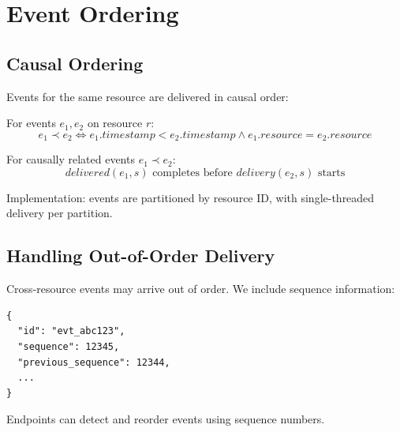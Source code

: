 \section{Event Ordering}


\subsection{Causal Ordering}

Events for the same resource are delivered in causal order:

\begin{definition}
For events $e_1, e_2$ on resource $r$:
\[
e_1 \prec e_2 \iff e_1.timestamp < e_2.timestamp \land e_1.resource = e_2.resource
\]
\end{definition}

\begin{theorem}
For causally related events $e_1 \prec e_2$:
\[
delivered(e_1, s) \text{ completes before } delivery(e_2, s) \text{ starts}
\]
\end{theorem}

Implementation: events are partitioned by resource ID, with single-threaded delivery per partition.

\subsection{Handling Out-of-Order Delivery}

Cross-resource events may arrive out of order. We include sequence information:

\begin{lstlisting}[caption=Sequence Metadata]
{
  "id": "evt_abc123",
  "sequence": 12345,
  "previous_sequence": 12344,
  ...
}
\end{lstlisting}

Endpoints can detect and reorder events using sequence numbers.

